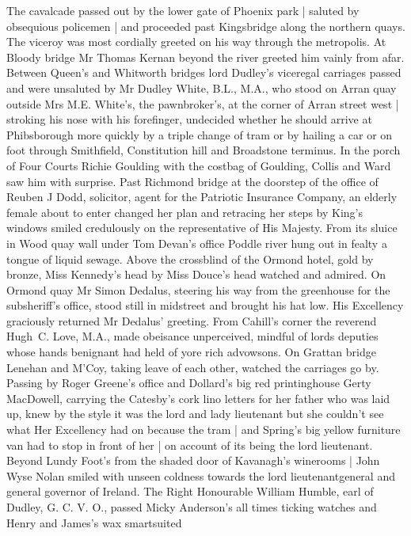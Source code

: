 The cavalcade passed out by the lower gate of Phoenix park |
saluted by obsequious policemen |
and proceeded past Kingsbridge along the northern quays.
The viceroy was most cordially greeted on his way through the metropolis.
At Bloody bridge Mr Thomas Kernan beyond the river
greeted him vainly from afar.
Between Queen's and Whitworth bridges lord
Dudley's viceregal carriages passed
and were unsaluted by Mr Dudley White, B.L., M.A.,
who stood on Arran quay outside Mrs M.E. White's,
the pawnbroker's,
at the corner of Arran street west |
stroking his nose with his forefinger, undecided whether he should arrive at Phibsborough
more quickly by a triple change of tram or by hailing a car or on foot
through Smithfield, Constitution hill and Broadstone terminus.
In the porch of Four Courts Richie Goulding with the costbag of Goulding,
Collis and Ward saw him with surprise. Past Richmond bridge at the
doorstep of the office of Reuben J Dodd, solicitor, agent for the
Patriotic Insurance Company, an elderly female about to enter changed
her plan and retracing her steps by King's windows smiled credulously
on the representative of His Majesty. From its sluice in Wood quay
wall under Tom Devan's office Poddle river hung out in fealty a tongue
of liquid sewage. Above the crossblind of the Ormond hotel, gold by
bronze, Miss Kennedy's head by Miss Douce's head watched and admired.
On Ormond quay Mr Simon Dedalus,
steering his way from the greenhouse for the subsheriff's office,
stood still in midstreet and brought his hat low.
His Excellency graciously returned Mr Dedalus' greeting.
From Cahill's corner the reverend Hugh~C. Love, M.A., made obeisance
unperceived, mindful of lords deputies whose hands benignant
had held of yore rich advowsons. On Grattan bridge Lenehan and M'Coy,
taking leave of each other, watched the carriages go by. Passing by Roger
Greene's office and Dollard's big red printinghouse Gerty MacDowell,
carrying the Catesby's cork lino letters for her father who was laid up,
knew by the style it was the lord and lady lieutenant but she couldn't see
what Her Excellency had on because the tram |
and Spring's big yellow furniture van had to stop in front of her |
on account of its being the lord lieutenant.
Beyond Lundy Foot's from the shaded door of Kavanagh's winerooms |
John Wyse Nolan smiled with unseen coldness towards the lord
lieutenantgeneral and general governor of Ireland. The Right Honourable
William Humble, earl of Dudley, G. C. V. O., passed Micky Anderson's
all times ticking watches and Henry and James's wax smartsuited
